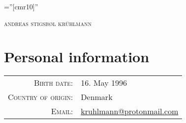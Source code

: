 \documentclass[a4paper,10pt]{article}
\begin{document}

\pagestyle{empty} %

\font\fb=''[cmr10]'' %

\par{\centering
		{\Huge \textsc{andreas stigsb\o l kr\"uhlmann}
	}\bigskip\par}

\section{Personal information}

\begin{tabular}{rl}
    \textsc{Birth date:} & 16. May 1996\\
    \textsc{Country of origin:}     & Denmark\\
    \textsc{Email:}       & \href{mailto:kruhlmann@protonmail.com}{kruhlmann@protonmail.com}
\end{tabular}

\end{document}
